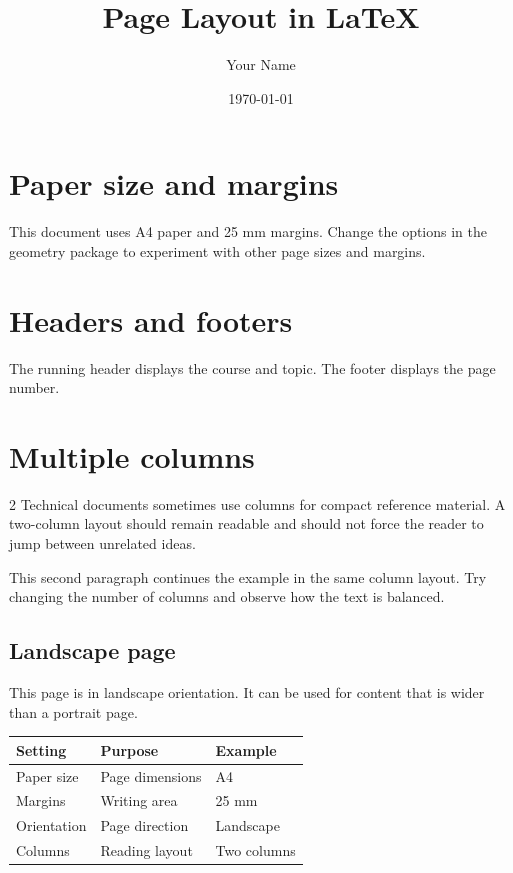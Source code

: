 \documentclass[11pt,a4paper]{article}
\title{Page Layout in LaTeX}
\author{Your Name}
\date{\today}
\begin{document}
\maketitle
\section{Paper size and margins}
This document uses A4 paper and 25 mm margins. Change the options in the geometry package to experiment with other page sizes and margins.

\section{Headers and footers}
The running header displays the course and topic. The footer displays the page number.

\section{Multiple columns}
\begin{multicols}{2}
Technical documents sometimes use columns for compact reference material. A two-column layout should remain readable and should not force the reader to jump between unrelated ideas.

This second paragraph continues the example in the same column layout. Try changing the number of columns and observe how the text is balanced.
\end{multicols}

\begin{landscape}
\section{Landscape page}
This page is in landscape orientation. It can be used for content that is wider than a portrait page.
\begin{center}
\begin{tabular}{lll}
\toprule
Setting & Purpose & Example\\
\midrule
Paper size & Page dimensions & A4\\
Margins & Writing area & 25 mm\\
Orientation & Page direction & Landscape\\
Columns & Reading layout & Two columns\\
\bottomrule
\end{tabular}
\end{center}
\end{landscape}
\end{document}
